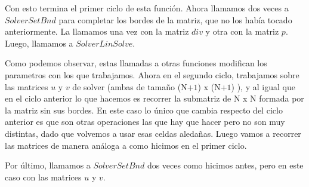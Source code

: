 \par Con esto termina el primer ciclo de esta función. Ahora llamamos dos veces a $Solver Set Bnd$ para completar los bordes de la matriz, que no los había tocado anteriormente. La llamamos una vez con la matriz $div$ y otra con la matriz $p$. Luego, llamamos a $Solver Lin Solve$.\newline

\par Como podemos observar, estas llamadas a otras funciones modifican los parametros con los que trabajamos. Ahora en el segundo ciclo, trabajamos sobre las matrices $u$ y $v$ de solver (ambas de tamaño (N+$1$) x (N+$1$) ), y al igual que en el ciclo anterior lo que hacemos es recorrer la submatriz de N x N formada por la matriz sin sus bordes. En este caso lo único que cambia respecto del ciclo anterior es que son otras operaciones las que hay que hacer pero no son muy distintas, dado que volvemos a usar esas celdas aledañas. Luego vamos a recorrer las matrices de manera análoga a como hicimos en el primer ciclo.\newline

\par Por último, llamamos a $Solver Set Bnd$ dos veces como hicimos antes, pero en este caso con las matrices $u$ y $v$.\newline
